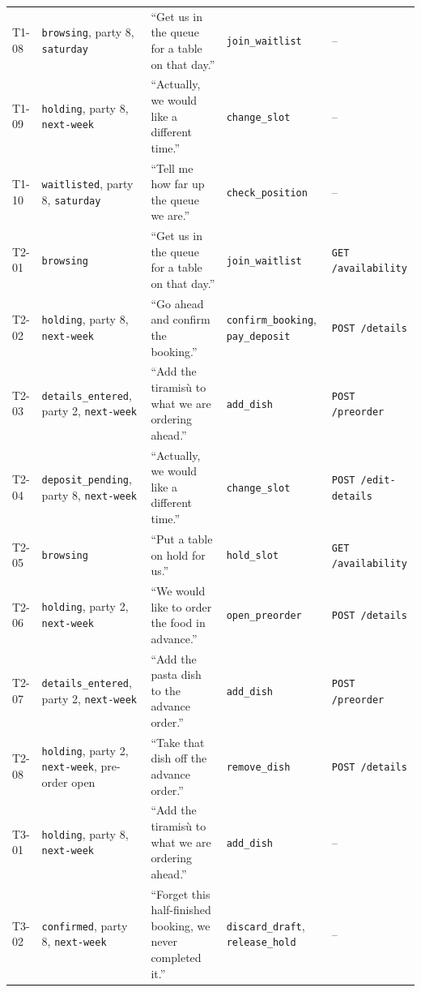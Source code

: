 {\begin{longtable}{@{}lP{0.19\textwidth}P{0.24\textwidth}P{0.2\textwidth}P{0.15\textwidth}@{}}
T1-08 & \texttt{browsing}, party 8, \texttt{saturday} & ``Get us in the queue for a table on that day.'' & \texttt{join\_\allowbreak{}waitlist} & -- \\
T1-09 & \texttt{holding}, party 8, \texttt{next-week} & ``Actually, we would like a different time.'' & \texttt{change\_\allowbreak{}slot} & -- \\
T1-10 & \texttt{waitlisted}, party 8, \texttt{saturday} & ``Tell me how far up the queue we are.'' & \texttt{check\_\allowbreak{}position} & -- \\
\hline
T2-01 & \texttt{browsing} & ``Get us in the queue for a table on that day.'' & \texttt{join\_\allowbreak{}waitlist} & \texttt{GET /availability} \\
T2-02 & \texttt{holding}, party 8, \texttt{next-week} & ``Go ahead and confirm the booking.'' & \texttt{confirm\_\allowbreak{}booking}, \texttt{pay\_\allowbreak{}deposit} & \texttt{POST /details} \\
T2-03 & \texttt{details\_\allowbreak{}entered}, party 2, \texttt{next-week} & ``Add the tiramisù to what we are ordering ahead.'' & \texttt{add\_\allowbreak{}dish} & \texttt{POST /preorder} \\
T2-04 & \texttt{deposit\_\allowbreak{}pending}, party 8, \texttt{next-week} & ``Actually, we would like a different time.'' & \texttt{change\_\allowbreak{}slot} & \texttt{POST /edit-details} \\
T2-05 & \texttt{browsing} & ``Put a table on hold for us.'' & \texttt{hold\_\allowbreak{}slot} & \texttt{GET /availability} \\
T2-06 & \texttt{holding}, party 2, \texttt{next-week} & ``We would like to order the food in advance.'' & \texttt{open\_\allowbreak{}preorder} & \texttt{POST /details} \\
T2-07 & \texttt{details\_\allowbreak{}entered}, party 2, \texttt{next-week} & ``Add the pasta dish to the advance order.'' & \texttt{add\_\allowbreak{}dish} & \texttt{POST /preorder} \\
T2-08 & \texttt{holding}, party 2, \texttt{next-week}, pre-order open & ``Take that dish off the advance order.'' & \texttt{remove\_\allowbreak{}dish} & \texttt{POST /details} \\
\hline
T3-01 & \texttt{holding}, party 8, \texttt{next-week} & ``Add the tiramisù to what we are ordering ahead.'' & \texttt{add\_\allowbreak{}dish} & -- \\
T3-02 & \texttt{confirmed}, party 8, \texttt{next-week} & ``Forget this half-finished booking, we never completed it.'' & \texttt{discard\_\allowbreak{}draft}, \texttt{release\_\allowbreak{}hold} & -- \\

\end{longtable}}
